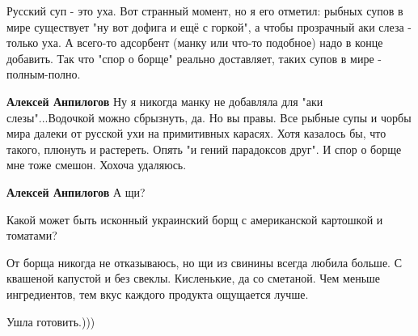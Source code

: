 \begin{itemize}
Русский суп - это уха. Вот странный момент, но я его отметил: рыбных супов в
мире существует "ну вот дофига и ещё с горкой", а чтобы прозрачный аки слеза -
только уха. А всего-то адсорбент (манку или что-то подобное) надо в конце
добавить. Так что "спор о борще" реально доставляет, таких супов в мире -
полным-полно.

\begin{itemize}
 
\textbf{Алексей Анпилогов} Ну я никогда манку не добавляла для "аки слезы"...Водочкой можно сбрызнуть, да. Но вы правы. Все рыбные супы и чорбы мира далеки от русской ухи на примитивных карасях. Хотя казалось бы, что такого, плюнуть и растереть. Опять "и гений парадоксов друг". И спор о борще мне тоже смешон. Хохоча удаляюсь.

 
\textbf{Алексей Анпилогов} А щи?
\end{itemize}

 
Какой может быть исконный украинский борщ с американской картошкой и томатами?

 

От борща никогда не отказываюсь, но щи из свинины всегда любила больше. С
квашеной капустой и без свеклы. Кисленькие, да со сметаной. Чем меньше
ингредиентов, тем вкус каждого продукта ощущается лучше.

Ушла готовить.)))

\begin{itemize}

 

\end{itemize}
\end{itemize}
